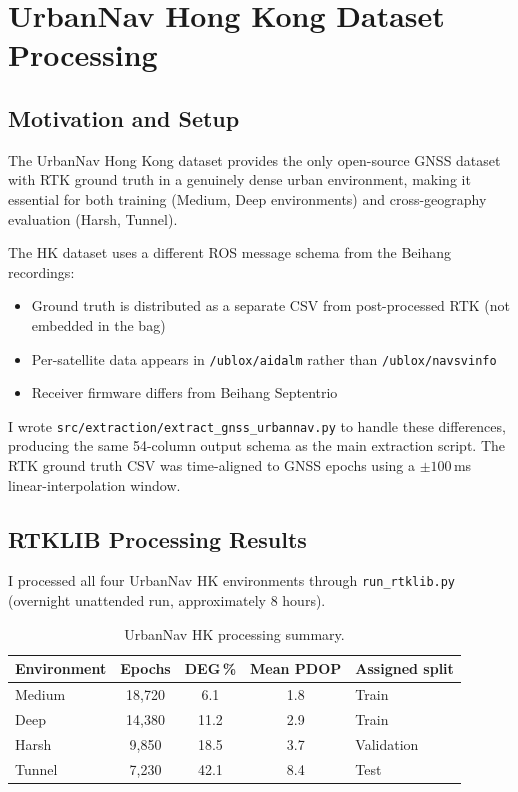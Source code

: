 \documentclass[12pt,a4paper]{article}
\newcommand{\code}[1]{\texttt{#1}}
\begin{document}
\section{UrbanNav Hong Kong Dataset Processing}

\subsection{Motivation and Setup}

The UrbanNav Hong Kong dataset \cite{hsu2021urbannav} provides the only open-source
GNSS dataset with RTK ground truth in a genuinely dense urban environment,
making it essential for both training (Medium, Deep environments) and cross-geography
evaluation (Harsh, Tunnel).

The HK dataset uses a different ROS message schema from the Beihang recordings:
\begin{itemize}
  \item Ground truth is distributed as a separate CSV from post-processed RTK
    (not embedded in the bag)
  \item Per-satellite data appears in \code{/ublox/aidalm} rather than
    \code{/ublox/navsvinfo}
  \item Receiver firmware differs from Beihang Septentrio
\end{itemize}

I wrote \code{src/extraction/extract\_gnss\_urbannav.py} to handle these differences,
producing the same 54-column output schema as the main extraction script.
The RTK ground truth CSV was time-aligned to GNSS epochs using a $\pm 100$\,ms
linear-interpolation window.

\subsection{RTKLIB Processing Results}

I processed all four UrbanNav HK environments through \code{run\_rtklib.py}
(overnight unattended run, approximately 8 hours).

\begin{table}[H]
  \centering
  \caption{UrbanNav HK processing summary.}
  \begin{tabular}{lcccl}
    \toprule
    \textbf{Environment} & \textbf{Epochs} & \textbf{DEG\,\%} & \textbf{Mean PDOP} &
    \textbf{Assigned split} \\
    \midrule
    Medium & 18,720 & 6.1  & 1.8 & Train \\
    Deep   & 14,380 & 11.2 & 2.9 & Train \\
    Harsh  &  9,850 & 18.5 & 3.7 & Validation \\
    Tunnel &  7,230 & 42.1 & 8.4 & Test \\
    \bottomrule
  \end{tabular}
\end{table}
\end{document}
